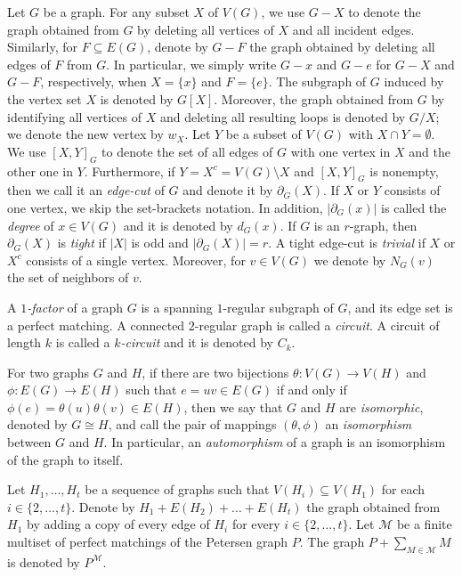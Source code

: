 \documentclass[a4paper,11pt]{article}
\newcommand{\ca}{\mathcal}
\theoremstyle{remark}
\begin{document}
Let $ G $ be a graph.
For any subset $ X $ of $ V(G) $, we  use $ G-X $ to denote the graph obtained from $ G $ by deleting all vertices of $ X $ and all incident edges. Similarly, for $ F \subseteq E(G) $, denote by $ G-F $ the graph obtained by deleting all edges of $F$ from $ G $.  In particular, we simply write 
$ G-x $ and $ G-e $ for $ G-X $ and $ G-F $, respectively, when $ X=\{x\} $ and $ F=\{e\} $.  The subgraph of $ G $ induced by the vertex set $ X $ is denoted by $ G[X] $. Moreover, the graph obtained from $ G $ by identifying all vertices of $ X $ and deleting all resulting loops is denoted  by $ G/X $;  we denote the new vertex by $w_X$.
Let $Y$ be a subset of $ V(G) $ with $ X\cap Y=\emptyset $. We use $ [X,Y]_G $ to denote the set of all edges of $ G $ with one vertex in $ X $ and the other one  in $Y$. Furthermore, if $ Y=X^c=V(G)\setminus X $ and $ [X,Y]_G $ is nonempty, 
then we call it an \emph{edge-cut} of $ G $ and denote it by $\partial_G(X)$. If  $ X $ or $ Y $ consists of one vertex, we skip the set-brackets notation.
In addition,  $|\partial_{G}(x)| $ is called the \emph{degree} of $ x \in V(G)$ and it is denoted by $d_G(x)$.
If $G$ is an $r$-graph, then $\partial_G(X)$
is \emph{tight} if $|X|$ is odd and $|\partial_G(X)|=r$. A tight edge-cut is \emph{trivial} if   $X$ or $X^c$ consists of a single vertex. Moreover, for $v \in V(G)$ we denote by $N_G(v)$ the set of neighbors of $v$.

A \emph{$ 1 $-factor}  of a graph $G $ is a spanning $ 1 $-regular subgraph of  $ G$, and its edge set is a perfect matching.
A connected $ 2 $-regular graph is called a  \emph{circuit}. A circuit of length $k$ is
called a \emph{$ k $-circuit} and it is denoted by $C_k$. 

For two graphs $ G $ and $ H $, if there are two bijections $ \theta: V(G) \to V(H)$ and $ \phi:E(G)\to E(H)  $ such that  $ e=uv\in E(G) $ if and only if $ \phi (e)=\theta(u)\theta(v)\in E(H)  $, then we say that $ G $ and $ H $ are {\em isomorphic}, denoted by $ G\cong H $, and call the pair of mappings $ (\theta,\phi) $ an  {\em isomorphism} between $ G $ and $ H $. In particular, an {\em automorphism} of a graph is an isomorphism of the graph to itself. 


Let   $ H_1, \ldots, H_t $ be a sequence of graphs such that $V( H_i)\subseteq V(H_1) $ for each $ i\in\{2,\ldots,t\} $.  Denote by $H_1+E(H_2)+\ldots+E(H_t)$ the graph obtained from $H_1$ by adding a copy of every edge of $H_i$ for every $i\in\{2,\dots,t\}$. 
Let $\ca M$ be a finite multiset of perfect matchings of the Petersen graph $P$. 
The graph $P+\sum_{M\in\ca M}M$ is denoted by $P^{\ca M}$.
\end{document}
